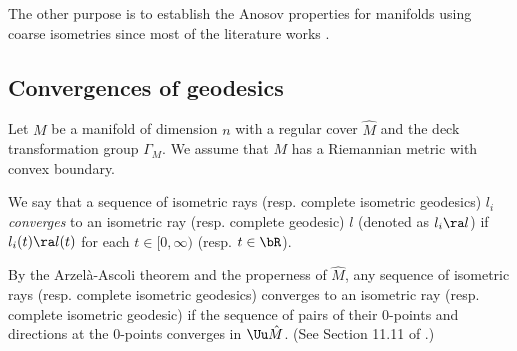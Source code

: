 

The other purpose is to establish the Anosov properties for manifolds using coarse isometries since most of the literature works .


\subsection{Convergences of geodesics} \label{sub:geoconv}  
Let $M$ be a manifold of dimension $n$ with a regular cover $\hat{M}$ and the deck transformation group $\Gamma_M$. We assume that $M$ has a Riemannian metric with convex boundary.

We say that a sequence of isometric rays (resp. complete isometric geodesics) $l_i$ \emph{converges} to an isometric ray (resp. complete geodesic) $l$ (denoted as $l_i \ra l$) if $l_i(t) \ra l(t)$ for each $t \in [0, \infty)$ (resp. $t \in \bR$).

By the Arzel\`a-Ascoli theorem and the properness of $\hat{M}$, any sequence of isometric rays (resp. complete isometric geodesics) converges to an isometric ray (resp. complete isometric geodesic) if the sequence of pairs of their $0$-points and directions at the $0$-points converges in $\Uu \hat{M}$. (See Section 11.11 of \cite{DK2018}.)


